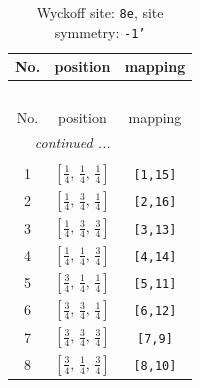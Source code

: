 \documentclass[fleqn,8pt]{jsarticle}
\begin{document}
\renewcommand{\arraystretch}{1.2}
\begin{longtable}{ccc}
\caption{Wyckoff site: {\tt 8e}, site symmetry: {\tt -1'}}
 \\
 \hline \hline
No. & position & mapping \\ \hline \endfirsthead

\multicolumn{2}{l}{\tablename\ \thetable{}} \\
 \hline \hline
No. & position & mapping \\ \hline \endhead

 \hline \hline
\multicolumn{2}{r}{\footnotesize\it continued ...} \\ \endfoot

 \hline \hline
\multicolumn{2}{r}{} \\ \endlastfoot

1 & $\left[ \frac{1}{4},\, \frac{1}{4},\, \frac{1}{4} \right]$ & {\tt [1,15]} \\ \hline
2 & $\left[ \frac{1}{4},\, \frac{3}{4},\, \frac{1}{4} \right]$ & {\tt [2,16]} \\ \hline
3 & $\left[ \frac{1}{4},\, \frac{3}{4},\, \frac{3}{4} \right]$ & {\tt [3,13]} \\ \hline
4 & $\left[ \frac{1}{4},\, \frac{1}{4},\, \frac{3}{4} \right]$ & {\tt [4,14]} \\ \hline
5 & $\left[ \frac{3}{4},\, \frac{1}{4},\, \frac{1}{4} \right]$ & {\tt [5,11]} \\ \hline
6 & $\left[ \frac{3}{4},\, \frac{3}{4},\, \frac{1}{4} \right]$ & {\tt [6,12]} \\ \hline
7 & $\left[ \frac{3}{4},\, \frac{3}{4},\, \frac{3}{4} \right]$ & {\tt [7,9]} \\ \hline
8 & $\left[ \frac{3}{4},\, \frac{1}{4},\, \frac{3}{4} \right]$ & {\tt [8,10]} \\
\end{longtable}
\renewcommand{\arraystretch}{1.2}
\end{document}
